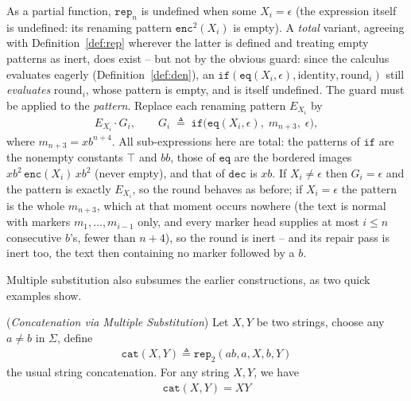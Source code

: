 \documentclass[runningheads,envcountsect]{llncs}
\renewenvironment{remark}
  {\rmfamily\trivlist\item[\hskip\labelsep{\itshape Remark.}]\ignorespaces}
  {\endtrivlist}
\begin{document}
\begin{remark}
    \label{rem:total-rep}
    As a partial function, $\mathtt{rep}_n$ is undefined when some $X_i = \epsilon$ (the expression itself is undefined: its renaming pattern $\mathtt{enc}^2(X_i)$ is empty). A \emph{total} variant, agreeing with Definition~\ref{def:rep} wherever the latter is defined and treating empty patterns as inert, does exist -- but not by the obvious guard: since the calculus evaluates eagerly (Definition~\ref{def:den}), an $\mathtt{if}(\mathtt{eq}(X_i,\epsilon), \text{identity}, \text{round}_i)$ still \emph{evaluates} $\text{round}_i$, whose pattern is empty, and is itself undefined. The guard must be applied to the \emph{pattern}. Replace each renaming pattern $E_{X_i}$ by
    \begin{align}
        E_{X_i} \cdot G_i, \qquad G_i \;\triangleq\; \mathtt{if}\big(\mathtt{eq}(X_i, \epsilon),\; m_{n+3},\; \epsilon\big),
    \end{align}
    where $m_{n+3} = xb^{n+4}$. All sub-expressions here are total: the patterns of $\mathtt{if}$ are the nonempty constants $\top$ and $bb$, those of $\mathtt{eq}$ are the bordered images $xb^2\,\mathtt{enc}(X_i)\,xb^2$ (never empty), and that of $\mathtt{dec}$ is $xb$. If $X_i \neq \epsilon$ then $G_i = \epsilon$ and the pattern is exactly $E_{X_i}$, so the round behaves as before; if $X_i = \epsilon$ the pattern is the whole $m_{n+3}$, which at that moment occurs nowhere (the text is normal with markers $m_1, \dots, m_{i-1}$ only, and every marker head supplies at most $i \leq n$ consecutive $b$'s, fewer than $n+4$), so the round is inert -- and its repair pass is inert too, the text then containing no marker followed by a $b$.
\end{remark}

Multiple substitution also subsumes the earlier constructions, as two quick examples show.

\begin{theorem}
    (\emph{Concatenation via Multiple Substitution})
    Let $X,Y$ be two strings, choose any $a\neq b$ in $\Sigma$, define
    \begin{align}
        \mathtt{cat}(X,Y) \triangleq \mathtt{rep}_{2}(ab, a, X, b, Y)
    \end{align}
    the usual string concatenation.
    For any string $X,Y$, we have
    \begin{align}
        \mathtt{cat}(X,Y) = XY
    \end{align}
\end{theorem}
\end{document}
